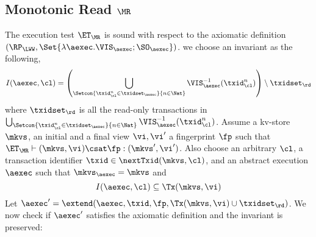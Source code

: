 \subsection{Monotonic Read \( \MR \)}
\label{sec:sound-complete-mr}

The execution test $\ET_\MR$ is sound with respect to the axiomatic definition $(\RP_{\LWW}, \Set{\lambda \aexec. \VIS_{\aexec} ; \SO_{\aexec} })$. 
we choose an invariant as the following,  
\[
    I(\aexec, \cl) = \left( \bigcup_{\Setcon{\txid_{\cl}^{n} \in \txidset_{\aexec} }{ n \in \Nat}} \VIS_{\aexec}^{-1}(\txid^n_\cl) \right) \setminus \txidset_\rd
\]
where \( \txidset_\rd \) is all the read-only transactions in 
\( \bigcup_{\Setcon{\txid_{\cl}^{n} \in \txidset_{\aexec} }{ n \in \Nat}} \VIS_{\aexec}^{-1}(\txid^n_\cl) \).
Assume a kv-store $\mkvs$, an initial and a final view $\vi, \vi'$  a fingerprint $\fp$ 
such that $\ET_{\MR} \vdash (\mkvs, \vi) \csat \fp: (\mkvs',\vi')$. 
Also choose an arbitrary $\cl$, a transaction identifier $\txid \in \nextTxid(\mkvs, \cl)$, 
and an abstract execution $\aexec$ such that $\mkvs_{\aexec} = \mkvs$ and 
\begin{equation}
I(\aexec, \cl) \subseteq \Tx(\mkvs, \vi)
\label{eq:mr_invariant}
\end{equation}
Let \( \aexec' = \extend(\aexec, \txid, \fp, \Tx(\mkvs, \vi) \cup \txidset_\rd) \).
We now check if \( \aexec' \) satisfies the axiomatic definition and the invariant is preserved:
